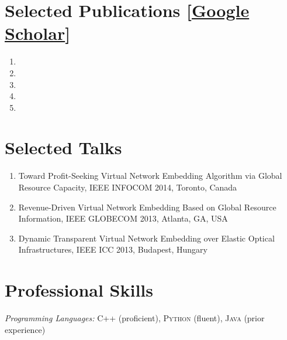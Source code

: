\documentclass[line,11pt,letter]{/Users/longgong/Dropbox/git-reps/easy_cv/includes/cls/myRes}
\begin{document}
\begin{resume}
\section{Selected Publications [\href{https://scholar.google.com/citations?user=qtAikfAAAAAJ&hl=en}{Google Scholar}]}
\vspace{-4pt}
\vspace*{2pt}
\begin{enumerate}[
  label=\arabic*. ,
  labelwidth=\widthof{1. },
  leftmargin=\widthof{1.\enspace}
  ] \itemsep -2pt %
    \item {}
    \item {}
    \item {}
    \item {}
    \item {}
  \end{enumerate}
\vspace*{2pt}\negspace
\section{Selected Talks}
\vspace{-4pt}
\vspace*{2pt}
\begin{enumerate}[
  label=\arabic*. ,
  labelwidth=\widthof{1. },
  leftmargin=\widthof{1.\enspace}
  ] \itemsep -2pt %
    \item  Toward Profit-Seeking Virtual Network Embedding Algorithm via Global Resource Capacity, IEEE INFOCOM 2014, Toronto, Canada
    \item  Revenue-Driven Virtual Network Embedding Based on Global Resource Information, IEEE GLOBECOM 2013, Atlanta, GA, USA
    \item  Dynamic Transparent Virtual Network Embedding over Elastic Optical Infrastructures, IEEE ICC 2013, Budapest, Hungary
  \end{enumerate}
\vspace*{2pt}\negspace
\section{Professional Skills}
\vspace{-4pt}
\setlength{\parskip}{0pt}
{\sl Programming Languages:} \textsc{C++} (proficient), \textsc{Python} (fluent), \textsc{Java} (prior experience)\\
\vspace*{4pt}
\negspace

\end{resume}
\end{document}
